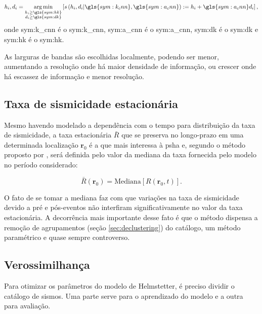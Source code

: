 \begin{equation}
	\ensuremath{
		h_i, d_i = \argmin_{\substack{h_i \ge \gls{sym:hk} \\
						              d_i \ge \gls{sym:dk}}
				           } 
		\left[ s \left(h_i,d_i 
			 		  \arrowvert
					  \gls{sym:k_cnn},\gls{sym:a_cnn}
			     \right) 
			   := h_i + \gls{sym:a_cnn}d_i 
	    \right],
	}
	\label{eq:helms_cnn}
\end{equation}
onde \gls{sym:k_cnn} é o \glsdesc{sym:k_cnn},
	 \gls{sym:a_cnn} é o \glsdesc{sym:a_cnn},
	 \gls{sym:dk} é o \glsdesc{sym:dk} e 
	 \gls{sym:hk} é o \glsdesc{sym:hk}.

As larguras de bandas são escolhidas localmente, podendo ser menor, aumentando a resolução 
onde há maior densidade de informação, ou crescer onde há escassez de informação e menor resolução.


\subsection{Taxa de sismicidade estacionária}
Mesmo havendo modelado a dependência com o tempo para distribuição da taxa de sismicidade,
a taxa estacionária $\bar{R}$ que se preserva no longo-prazo em uma determinada localização  
$\boldsymbol{r}_0$ é a que mais interessa à \gls{psha} e,
segundo o método proposto por \citet{helmstetter_2012}, será definida
pelo valor da mediana da taxa fornecida pelo modelo no
período considerado:

\begin{equation}
	\ensuremath{
		\bar{R}(\boldsymbol{r}_0) = \text{Mediana}\left[R(\boldsymbol{r}_0, t)\right].
	}
	\label{eq:helms_mediana}
\end{equation}

O fato de se tomar a mediana faz com que variações na taxa de sismicidade devido a pré e pós-eventos
não interfiram significativamente no valor da taxa estacionária. A decorrência mais importante desse fato
é que o método dispensa a remoção de agrupamentos (seção \ref{sec:declustering}) do catálogo, um método paramétrico e
quase sempre controverso.

\subsection{Verossimilhança}

Para otimizar os parâmetros do modelo de Helmstetter, é preciso dividir o catálogo de sismos.
Uma parte serve para o aprendizado do modelo e a outra para avaliação.

